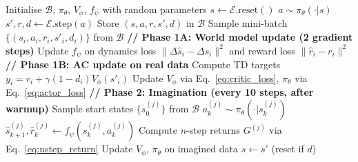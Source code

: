 \begin{algorithm}[!ht]
    \caption{Imagination-based actor-critic training loop}
    \label{algo:imag_ac}
    \begin{algorithmic}[1]
        \Statex
        \State Initialise $\mathcal{B}$, $\pi_\theta$, $V_\phi$, $f_\psi$ with random parameters
        \State $s \gets \mathcal{E}.\text{reset}()$
            \State $a \sim \pi_\theta(\cdot | s)$ 
            \State $s', r, d \gets \mathcal{E}.\text{step}(a)$
            \State Store $(s, a, r, s', d)$ in $\mathcal{B}$
                \State Sample mini-batch $\{(s_i, a_i, r_i, s'_i, d_i)\}$ from $\mathcal{B}$
                \Statex \hspace{\algorithmicindent}\hspace{\algorithmicindent}\textbf{// Phase 1A: World model update (2 gradient steps)}
                \State Update $f_\psi$ on dynamics loss $\|\Delta \hat{s}_i - \Delta s_i\|^2$ and reward loss $\|\hat{r}_i - r_i\|^2$
                \Statex \hspace{\algorithmicindent}\hspace{\algorithmicindent}\textbf{// Phase 1B: AC update on real data}
                \State Compute TD targets $y_i = r_i + \gamma(1-d_i) V_\phi(s'_i)$
                \State Update $V_\phi$ via Eq.~\eqref{eq:critic_loss}, $\pi_\theta$ via Eq.~\eqref{eq:actor_loss}
                \Statex \hspace{\algorithmicindent}\hspace{\algorithmicindent}\textbf{// Phase 2: Imagination (every 10 steps, after warmup)}
                    \State Sample start states $\{s^{(j)}_0\}$ from $\mathcal{B}$
                        \State $a^{(j)}_k \sim \pi_\theta(\cdot | s^{(j)}_k)$
                        \State $\hat{s}^{(j)}_{k+1}, \hat{r}^{(j)}_k \gets f_\psi(s^{(j)}_k, a^{(j)}_k)$
                    \EndFor
                    \State Compute $n$-step returns $G^{(j)}$ via Eq.~\eqref{eq:nstep_return}
                    \State Update $V_\phi$, $\pi_\theta$ on imagined data
                \EndIf
            \EndIf
            \State $s \gets s'$ (reset if $d$)
        \EndFor
    \end{algorithmic}
\end{algorithm}

